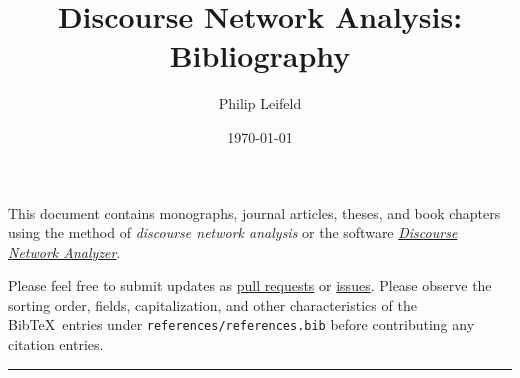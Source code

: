 \documentclass[a4paper, 11pt]{article}
\title{Discourse Network Analysis: Bibliography}
\author{Philip Leifeld}
\date{\today}
\begin{document}
\maketitle

This document contains monographs, journal articles, theses, and book chapters using the method of \emph{discourse network analysis} or the software \href{https://github.com/leifeld/dna/}{\emph{Discourse Network Analyzer}}.

Please feel free to submit updates as \href{https://github.com/leifeld/dna/pulls}{pull requests} or \href{https://github.com/leifeld/dna/issues}{issues}.
Please observe the sorting order, fields, capitalization, and other characteristics of the Bib\TeX\ entries under \verb+references/references.bib+ before contributing any citation entries.

\nocite{*}

\bigskip

\hrule



\end{document}
